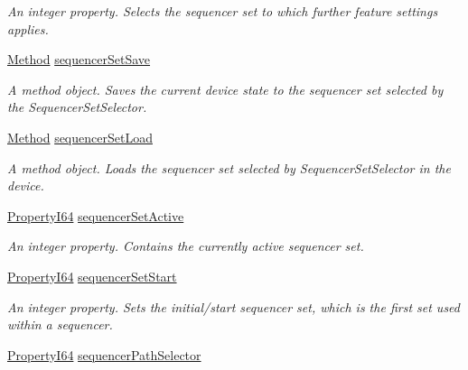 \begin{DoxyCompactItemize}
\begin{DoxyCompactList}\small\item\em An integer property. Selects the sequencer set to which further feature settings applies. \end{DoxyCompactList}\item 
\hyperlink{classmv_i_m_p_a_c_t_1_1acquire_1_1_method}{Method} \hyperlink{classmv_i_m_p_a_c_t_1_1acquire_1_1_gen_i_cam_1_1_sequencer_control_a16552a61786cbe9280b5ab174997c80a}{sequencer\+Set\+Save}
\begin{DoxyCompactList}\small\item\em A method object. Saves the current device state to the sequencer set selected by the Sequencer\+Set\+Selector. \end{DoxyCompactList}\item 
\hyperlink{classmv_i_m_p_a_c_t_1_1acquire_1_1_method}{Method} \hyperlink{classmv_i_m_p_a_c_t_1_1acquire_1_1_gen_i_cam_1_1_sequencer_control_aa3b1c98fb945874f5399281be7564f26}{sequencer\+Set\+Load}
\begin{DoxyCompactList}\small\item\em A method object. Loads the sequencer set selected by Sequencer\+Set\+Selector in the device. \end{DoxyCompactList}\item 
\hyperlink{group___common_interface_ga81749b2696755513663492664a18a893}{Property\+I64} \hyperlink{classmv_i_m_p_a_c_t_1_1acquire_1_1_gen_i_cam_1_1_sequencer_control_ab7c1aa6c23757b04d16a10d271802cb8}{sequencer\+Set\+Active}
\begin{DoxyCompactList}\small\item\em An integer property. Contains the currently active sequencer set. \end{DoxyCompactList}\item 
\hyperlink{group___common_interface_ga81749b2696755513663492664a18a893}{Property\+I64} \hyperlink{classmv_i_m_p_a_c_t_1_1acquire_1_1_gen_i_cam_1_1_sequencer_control_a4801f0f7996890b7cf3b1812fd8a93fb}{sequencer\+Set\+Start}
\begin{DoxyCompactList}\small\item\em An integer property. Sets the initial/start sequencer set, which is the first set used within a sequencer. \end{DoxyCompactList}\item 
\hyperlink{group___common_interface_ga81749b2696755513663492664a18a893}{Property\+I64} \hyperlink{classmv_i_m_p_a_c_t_1_1acquire_1_1_gen_i_cam_1_1_sequencer_control_aaa2c1ca336588b658c3e1f25e9d3ce7a}{sequencer\+Path\+Selector}

\end{DoxyCompactItemize}
